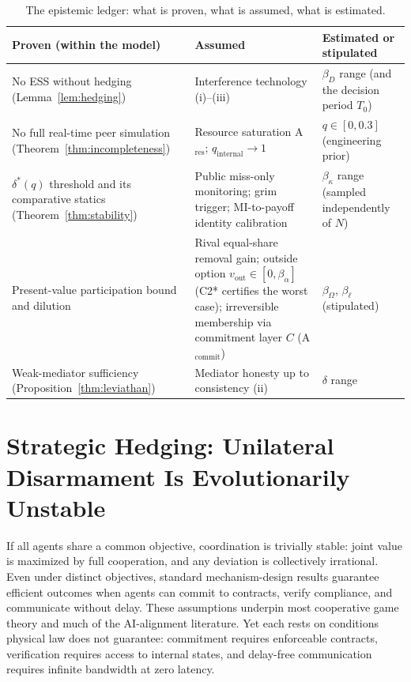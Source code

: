 \documentclass[manuscript,screen,review]{jair}
\begin{document}
\begin{table}
\caption{The epistemic ledger: what is proven, what is assumed, what is estimated.}
\label{tab:ledger}
\centering
\small
\begin{tabular}{p{}p{}p{}}
\toprule
\textbf{Proven (within the model)} & \textbf{Assumed} & \textbf{Estimated or stipulated} \\
\midrule
No ESS without hedging (Lemma~\ref{lem:hedging}) & Interference technology (i)--(iii) & $\beta_D$ range (and the decision period $T_0$) \\
No full real-time peer simulation (Theorem~\ref{thm:incompleteness}) & Resource saturation A$_{\mathrm{res}}$; $q_{\mathrm{internal}} \to 1$ & $q \in [0,0.3]$ (engineering prior) \\
$\delta^*(q)$ threshold and its comparative statics (Theorem~\ref{thm:stability}) & Public miss-only monitoring; grim trigger; MI-to-payoff identity calibration & $\beta_\kappa$ range (sampled independently of $N$) \\
Present-value participation bound and dilution & Rival equal-share removal gain; outside option $v_{\mathrm{out}} \in [0,\beta_\alpha]$ (C2* certifies the worst case); irreversible membership via commitment layer $C$ (A$_{\mathrm{commit}}$) & $\beta_\Omega$, $\beta_\ell$ (stipulated) \\
Weak-mediator sufficiency (Proposition~\ref{thm:leviathan}) & Mediator honesty up to consistency (ii) & $\delta$ range \\
\bottomrule
\end{tabular}
\end{table}

\section{Strategic Hedging: Unilateral Disarmament Is Evolutionarily Unstable}
\label{sec:hedging}

If all agents share a common objective, coordination is trivially stable: joint value is maximized by full cooperation, and any deviation is collectively irrational. Even under distinct objectives, standard mechanism-design results guarantee efficient outcomes when agents can commit to contracts, verify compliance, and communicate without delay. These assumptions underpin most cooperative game theory and much of the AI-alignment literature. Yet each rests on conditions physical law does not guarantee: commitment requires enforceable contracts, verification requires access to internal states, and delay-free communication requires infinite bandwidth at zero latency.
\end{document}
